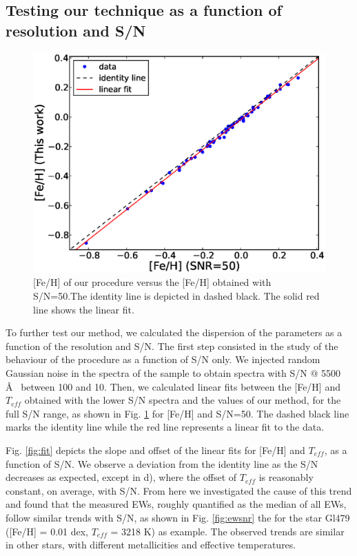 \documentclass{aa}
\begin{document}
\subsection{Testing our technique as a function of resolution and S/N}
\label{sec:testcal}

\begin{figure}[]
\begin{center}
\includegraphics[scale=0.40]{pics/fehfehsnrv2.eps}
\end{center}
\caption{[Fe/H] of our procedure versus the [Fe/H] obtained with S/N=50.The identity line is depicted in dashed black. The solid red line shows the linear fit.}
\label{fig:fehfehsnr}
\end{figure}



To further test our method, we calculated the dispersion of the parameters as a function of the resolution and S/N. The first step consisted in the study of the behaviour of the procedure as a function of S/N only. We injected random Gaussian noise in the spectra of the sample to obtain spectra with S/N @ 5500 \AA~ between 100 and 10. Then, we calculated linear fits between the [Fe/H] and $T_{eff}$ obtained with the lower S/N spectra and the values of our method, for the full S/N range, as shown in Fig. \ref{fig:fehfehsnr} for [Fe/H] and S/N=50. The dashed black line marks the identity line while the red line represents a linear fit to the data. 



Fig. \ref{fig:fit} depicts the slope and offset of the linear fits for [Fe/H] and $T_{eff}$, as a function of S/N. We observe a deviation from the identity line as the S/N decreases as expected, except in d), where the offset of $T_{eff}$ is reasonably constant, on average, with S/N. From here we investigated the cause of this trend and found that the measured EWs, roughly quantified as the median of all EWs, follow similar trends with S/N, as shown in Fig. \ref{fig:ewsnr} the for the star Gl479 ([Fe/H] = 0.01 dex, $T_{eff}$ = 3218 K) as example. The observed trends are similar in other stars, with different metallicities and effective temperatures.
\end{document}
